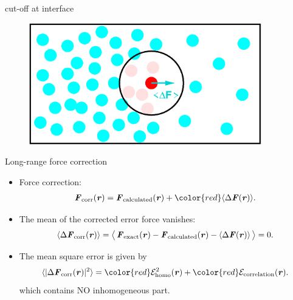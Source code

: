 \documentclass{beamer}
\newcommand{\redc}[1]{{\color{red} #1}}
\newcommand{\bluec}[1]{{\color{blue} #1}}
\renewcommand{\v}[1]{\textbf{\textit{#1}}}
\begin{document}
\begin{frame}{cut-off at interface}
  \begin{figure}
    \centering
    \includegraphics[width=0.9\textwidth]{figs/t0.85-n16000-rc07.5uni/cut-interface-step05.eps}
  \end{figure}  
\end{frame}

\begin{frame}{Long-range force correction}
  \begin{itemize}\itemsep -10pt
  \item<1-> Force correction:
    \bluec{
      \begin{align*}
        \v F_{\textrm{corr}}(\v r) =
        {\v F}_{\textrm{calculated}}(\v r) +
        \redc{\langle\Delta\v F(\v r)\rangle}.
      \end{align*}}
  \item<2->   The mean of
    the corrected error force vanishes:
    \bluec{
      \begin{align*}
        \langle\Delta\v F_{\textrm{corr}}(\v r)\rangle
        =
        \big\langle\,
        \v F_{\textrm{exact}}(\v r) - {\v F}_{\textrm{calculated}}(\v r) - \langle\Delta\v F(\v r)\rangle\,
        \big\rangle = 0.
      \end{align*}}
  \item<3-> The mean square error is given by
    \bluec{
      \begin{align*} \nonumber
        \langle\vert\Delta\v F_{\textrm{corr}}(\v r)\vert^2\rangle
        =
        \redc{\mathcal E^2_{\textrm{homo}}(\v r)} +
        \redc{\mathcal E_{\textrm{correlation}}(\v r)}.
      \end{align*}}
    which contains \redc{NO} inhomogeneous part.
  \end{itemize}
\end{frame}
\end{document}
